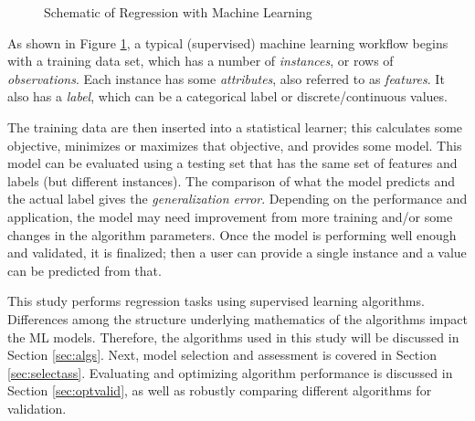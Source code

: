\begin{figure}[!htb]
  \caption{Schematic of Regression with Machine Learning}
  \label{fig:supervised}
\end{figure}

As shown in Figure \ref{fig:supervised}, a typical (supervised) machine
learning workflow begins with a training data set, which has a number of
\textit{instances}, or rows of \textit{observations}.  Each instance has some
\textit{attributes}, also referred to as \textit{features}. It also has a
\textit{label}, which can be a categorical label or discrete/continuous values.  

The training data are then inserted into a statistical learner; this calculates
some objective, minimizes or maximizes that objective, and provides some model.
This model can be evaluated using a testing set that has the same set of
features and labels (but different instances). The comparison of what the
model predicts and the actual label gives the \textit{generalization error}.
Depending on the performance and application, the model may need improvement
from more training and/or some changes in the algorithm parameters. Once the
model is performing well enough and validated, it is finalized; then a user can
provide a single instance and a value can be predicted from that. 

This study performs regression tasks using supervised learning algorithms.
Differences among the structure underlying mathematics of the algorithms impact the
\gls{ML} models.  Therefore, the algorithms used in this study will be discussed
in Section \ref{sec:algs}. Next, model selection and assessment is covered in
Section \ref{sec:selectass}.  Evaluating and optimizing algorithm performance
is discussed in Section \ref{sec:optvalid}, as well as robustly comparing
different algorithms for validation.

